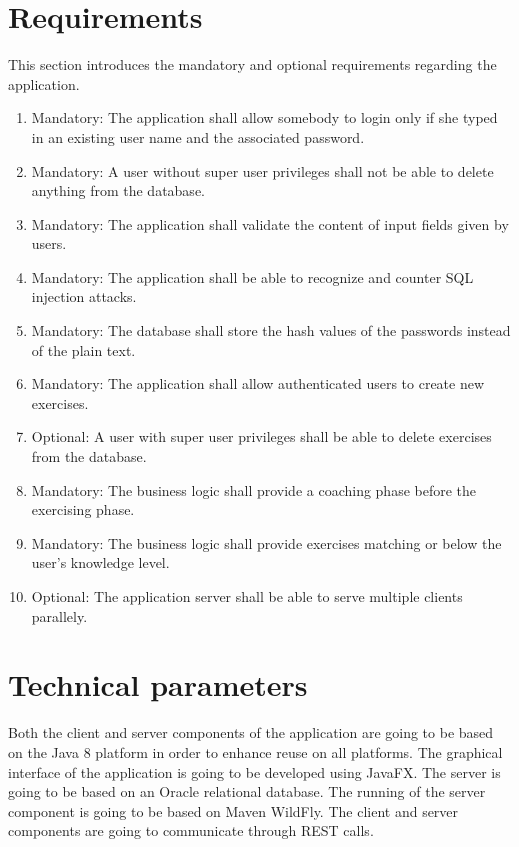 \documentclass[a4paper]{article}
\begin{document}
	
	\section{Requirements}
	This section introduces the mandatory and optional requirements regarding the application.
	\begin{enumerate}
		\item Mandatory: The application shall allow somebody to login only if she typed in an existing user name and the associated password.
		\item Mandatory: A user without super user privileges shall not be able to delete anything from the database.
		\item Mandatory:  The application shall validate the content of input fields given by users.
		\item Mandatory:  The application shall be able to recognize and counter SQL injection attacks.
		\item Mandatory:  The database shall store the hash values of the passwords instead of the plain text.
		\item Mandatory: The application shall allow authenticated users to create new exercises.
		\item Optional: A user with super user privileges shall be able to delete exercises from the database.
		\item Mandatory: The business logic shall provide a coaching phase before the exercising phase.
		\item  Mandatory:  The business logic shall provide exercises matching or below the user's knowledge level.
		\item Optional: The application server shall be able to serve multiple clients parallely. 

	\end{enumerate}
	
	\section{Technical parameters}
	Both the client and server components of the application are going to be based on the Java 8 platform in order to enhance reuse on all platforms. The graphical interface of the application is going to be developed using JavaFX. The server is going to be based on an Oracle relational database. The running of the server component is going to be based on Maven WildFly. The client and server components are going to communicate through REST calls.
	
\end{document}

